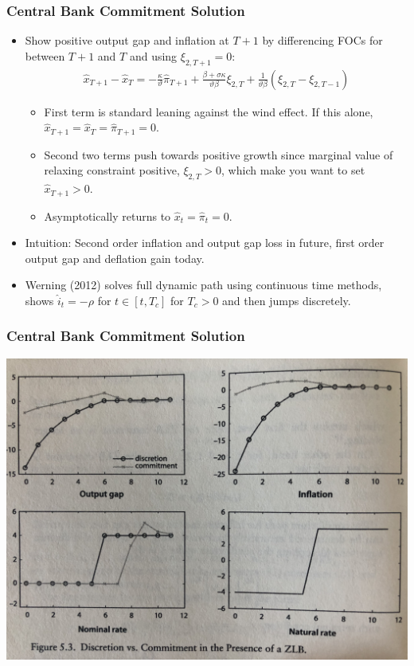 \documentclass[english,xcolor=svgnames]{beamer}
\begin{document}
\begin{frame}
\frametitle{Central Bank Commitment Solution}
\begin{itemize}
	\item Show positive output gap and inflation at $T+1$ by differencing FOCs for between $T+1$ and $T$ and using $\xi_{2,T+1}=0$:
	\begin{align*}
		\hat{x}_{T+1}-\hat{x}_{T}=-\frac{\kappa}{\vartheta}\hat{\pi}_{T+1}+\frac{\beta+\sigma\kappa}{\vartheta\beta}\xi_{2,T}+\frac{1}{\vartheta\beta}(\xi_{2,T}-\xi_{2,T-1}) 
	\end{align*}
	\begin{itemize}
		\item First term is standard leaning against the wind effect. If this alone, $\hat{x}_{T+1}=\hat{x}_{T}=\hat{\pi}_{T+1}=0$.
		\item Second two terms push towards positive growth since marginal value of relaxing constraint positive, $\xi_{2,T}>0$, which make you want to set $\hat{x}_{T+1}>0$.
		\item Asymptotically returns to $\hat{x}_t=\hat{\pi}_t=0$.
	\end{itemize}
	\item Intuition: Second order inflation and output gap loss in future, first order output gap and deflation gain today.
	\item Werning (2012) solves full dynamic path using continuous time methods, shows $\hat{i}_t =-\rho$ for $t\in[t,T_c]$ for $T_c>0$ and then jumps discretely.
\end{itemize}	
\end{frame}


\begin{frame}
\frametitle{Central Bank Commitment Solution}
\centering
\includegraphics[scale=0.075]{../../Images/Gali2018irfZLB.jpeg}
\end{frame}
\end{document}
